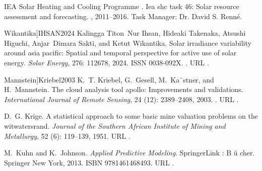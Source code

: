 \documentclass[letterpaper,12pt, twoside]{report}
\providecommand{\DIFdeltex}[1]{{\protect\color{red} \scriptsize #1}} %
\providecommand{\DIFdel}[1]{\texorpdfstring{\DIFdeltex{#1}}{}} %
\begin{document}
\DIFdel{IEA Solar Heating and Cooling Programme}%
\DIFdel{.
}%
\DIFdel{Iea shc task 46: Solar resource assessment and forecasting.
}%
\DIFdel{, 2011--2016.
}%
\DIFdel{Task Manager: Dr. David S. Renné.
}%

  Wikantika]{IHSAN2024}
\DIFdel{Kalingga Titon~Nur Ihsan, Hideaki Takenaka, Atsushi Higuchi, Anjar~Dimara
  Sakti, and Ketut Wikantika.
}%
\DIFdel{Solar irradiance variability around asia pacific: Spatial and
  temporal perspective for active use of solar energy.
}%
\DIFdel{\emph{Solar Energy}, 276:}%
\DIFdel{112678, 2024.
}%
\DIFdel{ISSN 0038-092X.
}%
\DIFdel{.
}%
\DIFdel{URL
  }%
\DIFdel{.
}%

  Mannstein]{Kriebel2003}
\DIFdel{K.~T. Kriebel, G.~Gesell, M.~Ka¨stner, and H.~Mannstein.
}%
\DIFdel{The cloud analysis tool apollo: Improvements and validations.
}%
\DIFdel{\emph{International Journal of Remote Sensing}, 24}%
\DIFdel{(12):}%
\DIFdel{2389--2408, 2003.
}%
\DIFdel{.
}%
\DIFdel{URL }%
\DIFdel{.
}%

\DIFdel{D.~G. Krige.
}%
\DIFdel{A statistical approach to some basic mine valuation problems on the
  witwatersrand.
}%
\DIFdel{\emph{Journal of the Southern African Institute of Mining and
  Metallurgy}, 52}%
\DIFdel{(6):}%
\DIFdel{119--139, 1951.
}%
\DIFdel{URL }%
\DIFdel{.
}%

\DIFdel{M.~Kuhn and K.~Johnson.
}%
\DIFdel{\emph{Applied Predictive Modeling}.
}%
\DIFdel{SpringerLink : B}%
\DIFdel{\"u}%
\DIFdel{cher. Springer New York, 2013.
}%
\DIFdel{ISBN 9781461468493.
}%
\DIFdel{URL }%
\DIFdel{.
}%
\end{document}
